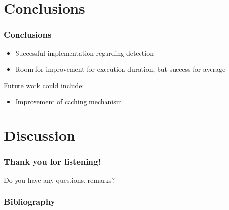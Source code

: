 \documentclass[xcolor=dvipsnames]{beamer}
\begin{document}
	\section{Conclusions}
	\begin{frame}
		\frametitle{Conclusions}
		\begin{itemize}
			\item Successful implementation regarding detection
			\item Room for improvement for execution duration, but success for average
		\end{itemize}
		\pause
		Future work could include:
		\begin{itemize}
			\item Improvement of caching mechanism
		\end{itemize}
	\end{frame}
	
	\section{Discussion}
	\begin{frame}
		\frametitle{Thank you for listening!}
		Do you have any questions, remarks?
	\end{frame}
	
	\begin{frame}[shrink=40,fragile]
		\frametitle{Bibliography}
		
		
	\end{frame}
\end{document}
